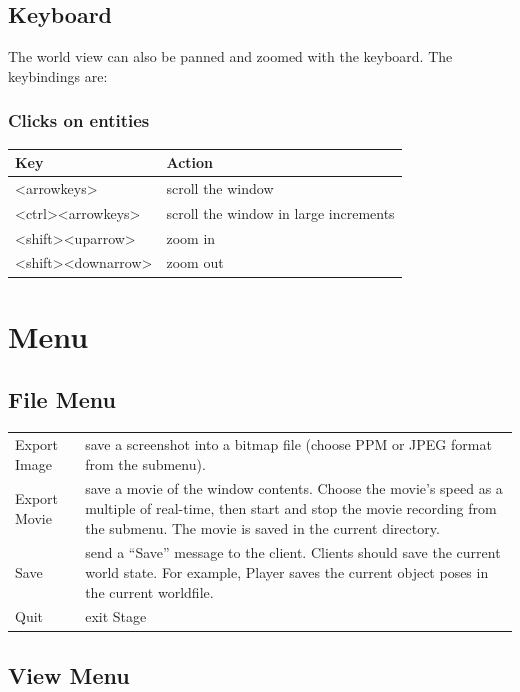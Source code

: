 \documentclass[letter,11pt,twoside]{report}
\begin{document}
\subsection{Keyboard}
The world view can also be panned and zoomed with the keyboard. The
keybindings are:

\subsubsection*{Clicks on entities}
\begin{tabular}{|l|l|}
\hline Key & Action\\ \hline
<arrowkeys>        & scroll the window \\
<ctrl><arrowkeys>  & scroll the window in large increments \\
<shift><uparrow>   & zoom in \\
<shift><downarrow> & zoom out \\
\hline 
\end{tabular}

\section{Menu}

\subsection{File Menu}

\begin{tabular}{|l|l|}
\hline 

Export Image & save a screenshot into a bitmap file (choose PPM or
JPEG format from the submenu).\\

Export Movie & save a movie of the window contents. Choose the movie's
speed as a multiple of real-time, then start and stop the movie
recording from the submenu. The movie is saved in the current
directory.\\

Save & send a ``Save'' message to the client. Clients should save the
current world state. For example, Player saves the current object
poses in the current worldfile.\\

Quit & exit Stage\\
\hline
\end{tabular}

\subsection{View Menu}
\end{document}
